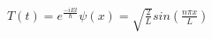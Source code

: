 \documentclass[preview]{standalone}
\begin{document}
\begin{center}
$T(t) = e^{\frac{-iEt}{\hbar}}  \psi(x) = \sqrt{\frac{2}{L}}sin(\frac{n\pi x}{L})$
\end{center}
\end{document}
